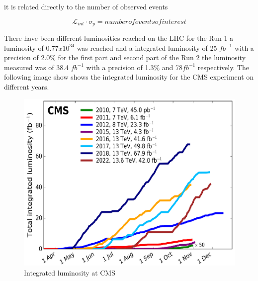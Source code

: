 it is related directly to the number of observed events 

\begin{equation}
\mathcal{L}_{int} \cdot \sigma_{p} = number of events of interest 
\end{equation}

There have been different luminosities reached on the LHC for the Run 1 a luminosity of $0.77 x 10^{34}$ was reached and a integrated luminosity of 25 $fb^{-1}$  with a precision of 2.0\% for the first part and second part of the Run 2 the luminosity measured was of 38.4 $fb^{-1}$ with a precision of 1.3\% and 78$fb^{-1}$ respectively\cite{LHClum}.  The following image show shows the integrated luminosity for the CMS experiment on different years.  

\begin{figure}[h]
    \centering
     \includegraphics[scale=1.25]{integratedlum.png}
     \caption{Integrated luminosity at CMS}
    \label{fig:CMS-Luminosity}
\end{figure}

